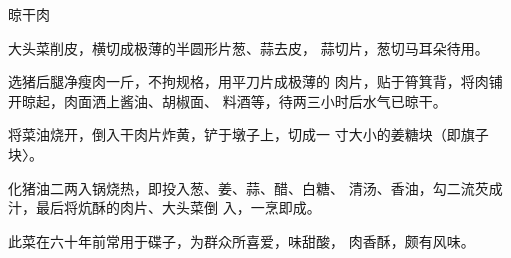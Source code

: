 \begin{recipe}{晾干肉}

\ingredients



\cooking

\step 大头菜削皮，横切成极薄的半圆形片葱、蒜去皮， 蒜切片，葱切马耳朵待用。

选猪后腿净瘦肉一斤，不拘规格，用平刀片成极薄的 肉片，贴于筲箕背，将肉铺开晾起，肉面洒上酱油、胡椒面、 料酒等，待两三小时后水气已晾干。

\step 	将菜油烧开，倒入干肉片炸黄，铲于墩子上，切成一 寸大小的姜糖块（即旗子块〉。

\step 	化猪油二两入锅烧热，即投入葱、姜、蒜、醋、白糖、 清汤、香油，勾二流芡成汁，最后将炕酥的肉片、大头菜倒 入，一烹即成。

\notes

此菜在六十年前常用于碟子，为群众所喜爱，味甜酸， 肉香酥，颇有风味。

\end{recipe}

